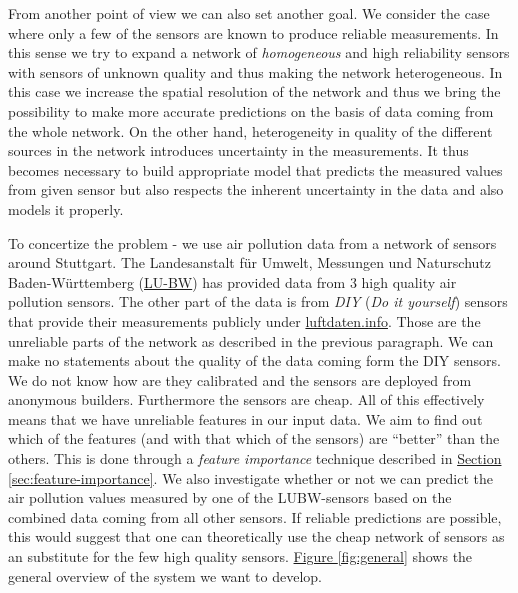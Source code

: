 \documentclass[12pt,a4paper,twoside]{scrartcl}
\numberwithin{equation}{section}
\newcommand{\reffig}[1]{\hyperref[#1]{Figure \ref*{#1}}}
\newcommand{\refsec}[1]{\hyperref[#1]{Section \ref*{#1}}}
\begin{document}
From another point of view we can also set another goal. We consider the case where only a few of the sensors are known to produce reliable measurements. In this sense we try to expand a network of \emph{homogeneous} and high reliability sensors with sensors of unknown quality and thus making the network heterogeneous. In this case we increase the spatial resolution of the network and thus we bring the possibility to make more accurate predictions on the basis of data coming from the whole network. On the other hand, heterogeneity in quality of the different sources in the network introduces uncertainty in the measurements. It thus becomes necessary to build appropriate model that predicts the measured values from given sensor but also respects the inherent uncertainty in the data and also models it properly.

To concertize the problem - we use air pollution data from a network of sensors around Stuttgart. The Landesanstalt für Umwelt, Messungen und Naturschutz Baden-Württemberg (\href{https://www.lubw.baden-wuerttemberg.de/startseite}{LU-BW}) has provided data from 3 high quality air pollution sensors. The other part of the data is from \emph{DIY} (\emph{Do it yourself}) sensors that provide their measurements publicly under \href{https://luftdaten.info/}{luftdaten.info}. Those are the unreliable parts of the  network as described in the previous paragraph. We can make no statements about the quality of the data coming form the DIY sensors. We do not know how are they calibrated and the sensors are deployed from anonymous builders. Furthermore the sensors are cheap. All of this effectively means that we have unreliable features in our input data. We aim to find out which of the features (and with that which of the sensors) are ``better'' than the others. This is done through a \emph{feature importance} technique described in \refsec{sec:feature-importance}. We also investigate whether or not we can predict the air pollution values measured by one of the LUBW-sensors based on the combined data coming from all other  sensors. If reliable predictions are possible, this would suggest that one can theoretically use the cheap network of sensors as an substitute for the few high quality sensors. \reffig{fig:general} shows the general overview of the system we want to develop.
\end{document}
